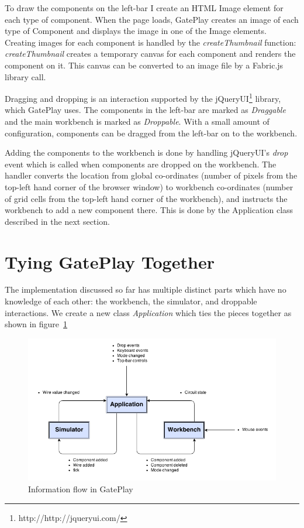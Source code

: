 To draw the components on the left-bar I create an HTML Image element for each type of component. When the page loads, GatePlay creates an image of each type of Component and displays the image in one of the Image elements. Creating images for each component is handled by the \textit{createThumbnail} function: \textit{createThumbnail} creates a temporary canvas for each component and renders the component on it. This canvas can be converted to an image file by a Fabric.js library call.

Dragging and dropping is an interaction supported by the jQueryUI\footnote{http://http://jqueryui.com/} library, which GatePlay uses. The components in the left-bar are marked as \textit{Draggable} and the main workbench is marked as \textit{Droppable}. With a small amount of configuration, components can be dragged from the left-bar on to the workbench.

Adding the components to the workbench is done by handling jQueryUI's \textit{drop} event which is called when components are dropped on the workbench. The handler converts the location from global co-ordinates (number of pixels from the top-left hand corner of the browser window) to workbench co-ordinates (number of grid cells from the top-left hand corner of the workbench), and instructs the workbench to add a new component there. This is done by the Application class described in the next section.

\section{Tying GatePlay Together}
\label{section:application}
The implementation discussed so far has multiple distinct parts which have no knowledge of each other: the workbench, the simulator, and droppable interactions. We create a new class \textit{Application} which ties the pieces together as shown in figure~\ref{fig:application}

\begin{figure}[H]
    \centering
    \includegraphics[width=\textwidth]{application.png}
    \caption{Information flow in GatePlay}
    \label{fig:application}
\end{figure}

